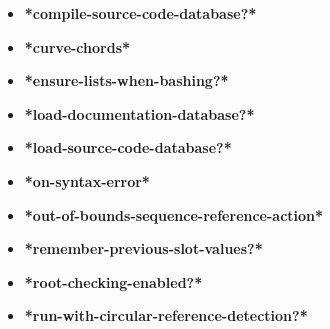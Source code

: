 \documentclass [11pt]{book}
\begin{document}
\begin{itemize}
\item {}
\label{prim:*compile-source-code-database?*}
\textbf{*compile-source-code-database?*}





\item {}
\label{prim:*curve-chords*}
\textbf{*curve-chords*}





\item {}
\label{prim:*ensure-lists-when-bashing?*}
\textbf{*ensure-lists-when-bashing?*}





\item {}
\label{prim:*load-documentation-database?*}
\textbf{*load-documentation-database?*}





\item {}
\label{prim:*load-source-code-database?*}
\textbf{*load-source-code-database?*}





\item {}
\label{prim:*on-syntax-error*}
\textbf{*on-syntax-error*}





\item {}
\label{prim:*out-of-bounds-sequence-reference-action*}
\textbf{*out-of-bounds-sequence-reference-action*}





\item {}
\label{prim:*remember-previous-slot-values?*}
\textbf{*remember-previous-slot-values?*}





\item {}
\label{prim:*root-checking-enabled?*}
\textbf{*root-checking-enabled?*}





\item {}
\label{prim:*run-with-circular-reference-detection?*}
\textbf{*run-with-circular-reference-detection?*}






\end{itemize}
\end{document}
